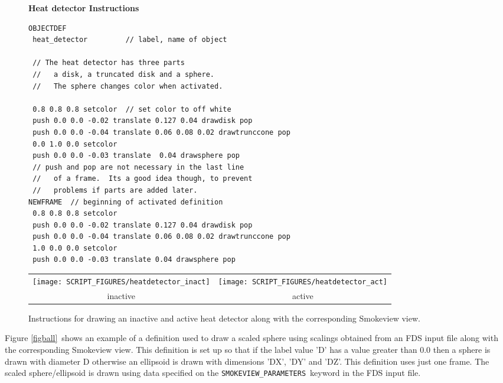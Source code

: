 \documentclass[11pt,twoside]{book}
\newcommand{\figheightA}{2.5in}
\begin{document}
\begin{figure}[bph]
{\bf Heat detector Instructions}\\
{\small
\begin{lstlisting}[frame=single,rulecolor=\color{yellow},
framerule=1pt,framesep=1pc,fillcolor=\color{yellow}]
OBJECTDEF
 heat_detector         // label, name of object

 // The heat detector has three parts
 //   a disk, a truncated disk and a sphere.
 //   The sphere changes color when activated.

 0.8 0.8 0.8 setcolor  // set color to off white
 push 0.0 0.0 -0.02 translate 0.127 0.04 drawdisk pop
 push 0.0 0.0 -0.04 translate 0.06 0.08 0.02 drawtrunccone pop
 0.0 1.0 0.0 setcolor
 push 0.0 0.0 -0.03 translate  0.04 drawsphere pop
 // push and pop are not necessary in the last line
 //   of a frame.  Its a good idea though, to prevent
 //   problems if parts are added later.
NEWFRAME  // beginning of activated definition
 0.8 0.8 0.8 setcolor
 push 0.0 0.0 -0.02 translate 0.127 0.04 drawdisk pop
 push 0.0 0.0 -0.04 translate 0.06 0.08 0.02 drawtrunccone pop
 1.0 0.0 0.0 setcolor
 push 0.0 0.0 -0.03 translate 0.04 drawsphere pop
\end{lstlisting}
}
\begin{center}
\begin{tabular}{cc}
 \texttt{[image: SCRIPT\_FIGURES/heatdetector\_inact]}&
 \texttt{[image: SCRIPT\_FIGURES/heatdetector\_act]}\\
inactive&active\\
 \end{tabular}
 \end{center}
\caption{Instructions for drawing an inactive and active heat detector
along with the corresponding Smokeview view.}
\label{figsprinkler}%
\end{figure}

Figure \ref{figball}\ shows an example of a definition used to draw a
scaled sphere using scalings obtained from an FDS input file along
with the corresponding Smokeview view.  This definition is set up
so that if the label value 'D' has a value greater than 0.0 then a
sphere is drawn with diameter D otherwise an ellipsoid is drawn with
dimensions 'DX', 'DY' and 'DZ'. This definition uses just one frame.
The scaled sphere/ellipsoid is drawn using data specified on the
{\tt SMOKEVIEW\_PARAMETERS}\ keyword in the FDS input file.
\end{document}
